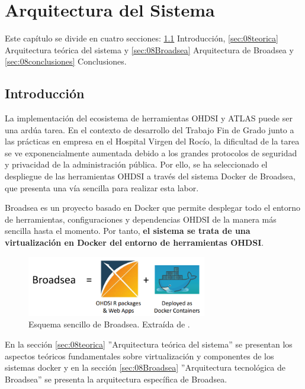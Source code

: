 \chapter{Arquitectura del Sistema}\label{cap:08arquitectura}

Este capítulo se divide en cuatro secciones: \ref{sec:08intro} Introducción, \ref{sec:08teorica} Arquitectura teórica del sistema y \ref{sec:08Broadsea} Arquitectura de Broadsea y \ref{sec:08conclusiones} Conclusiones.

\section{Introducción} \label{sec:08intro}

La implementación del ecosistema de herramientas OHDSI y ATLAS puede ser una ardúa tarea. En el contexto de desarrollo del Trabajo Fin de Grado junto a las prácticas en empresa en el Hospital Virgen del Rocío, la dificultad de la tarea se ve exponencialmente aumentada debido a los grandes protocolos de seguridad y privacidad de la administración pública. Por ello, se ha seleccionado el despliegue de las herramientas OHDSI a través del sistema Docker de Broadsea, que presenta una vía sencilla para realizar esta labor. 

Broadsea es un proyecto basado en Docker que permite desplegar todo el entorno de herramientas, configuraciones y dependencias OHDSI de la manera más sencilla hasta el momento. Por tanto, \textbf{el sistema se trata de una virtualización en Docker del entorno de herramientas OHDSI}.

\begin{figure}[H]
    \centering
    \includegraphics[width=0.70\textwidth]{figures/broadseaEq.png}
    \caption{Esquema sencillo de Broadsea. Extraída de \parencite{Broadsea3PPTX}.}
    \label{fig:broadseaEq}
\end{figure}

En la sección \ref{sec:08teorica} ''Arquitectura teórica del sistema'' se presentan los aspectos teóricos fundamentales sobre virtualización y componentes de los sistemas docker y en la sección \ref{sec:08Broadsea} ''Arquitectura tecnológica de Broadsea'' se presenta la arquitectura específica de Broadsea.

